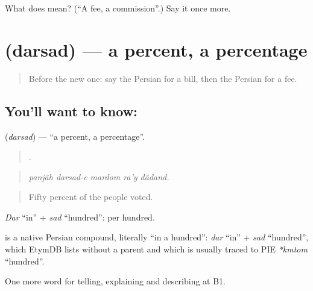 \begin{tcolorbox}[breakable,colback=teal!4,colframe=teal!35!black,title={Before you move on}]
What does  mean? (\textquotedblleft{}A fee, a commission\textquotedblright{}.) Say it once more.
\end{tcolorbox}
\section[\texorpdfstring{\fa{درصد} (darsad)}{درصد (darsad)}]{ (darsad) — a percent, a percentage}

\label{lesson:FA-C415-darsad}



\begin{quote}
Before the new one: say the Persian for a bill, then the Persian for a fee.
\end{quote}

\subsection*{You'll want to know: }
\textbf{} (\emph{darsad}) — \textquotedblleft{}a percent, a percentage\textquotedblright{}.

\begin{quote}
    .
\end{quote}

\begin{quote}
\emph{panjâh darsad-e mardom ra'y dâdand.}
\end{quote}

\begin{quote}
Fifty percent of the people voted.
\end{quote}

\emph{Dar} \textquotedblleft{}in\textquotedblright{} + \emph{sad} \textquotedblleft{}hundred\textquotedblright{}: per hundred.

\begin{cousinweb}
\textbf{} is a native Persian compound, literally \textquotedblleft{}in a hundred\textquotedblright{}: \emph{dar} \textquotedblleft{}in\textquotedblright{} + \emph{sad} \textquotedblleft{}hundred\textquotedblright{}, which EtymDB lists without a parent and which is usually traced to PIE \emph{*kmtom} \textquotedblleft{}hundred\textquotedblright{}.
\end{cousinweb}

\begin{grammarlens}[title={What you've built}]
One more word for telling, explaining and describing at B1.
\end{grammarlens}


